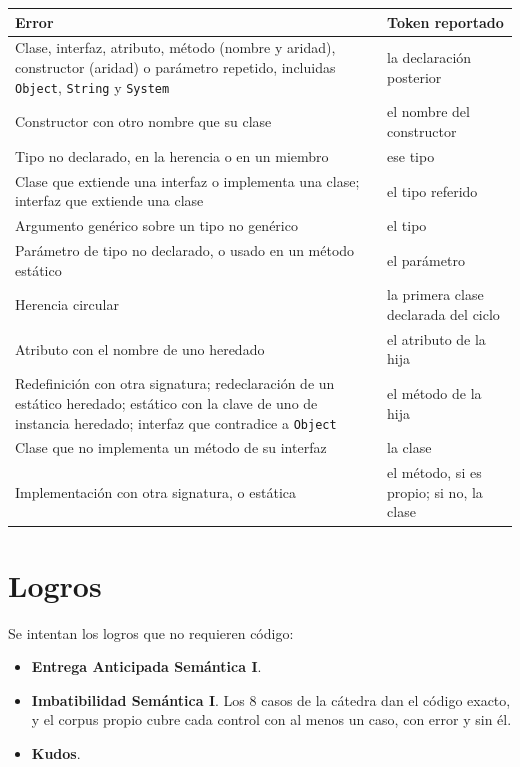 \documentclass[12pt,a4paper]{article}
\begin{document}
\begin{center}
\begin{tabular}{>{\raggedright\arraybackslash}p{9.6cm} >{\raggedright\arraybackslash}p{5.4cm}}
\toprule
\textbf{Error} & \textbf{Token reportado} \\
\midrule
Clase, interfaz, atributo, método (nombre y aridad), constructor (aridad) o parámetro repetido,
incluidas \texttt{Object}, \texttt{String} y \texttt{System} & la declaración posterior \\
Constructor con otro nombre que su clase & el nombre del constructor \\
Tipo no declarado, en la herencia o en un miembro & ese tipo \\
Clase que extiende una interfaz o implementa una clase; interfaz que extiende una clase & el tipo
referido \\
Argumento genérico sobre un tipo no genérico & el tipo \\
Parámetro de tipo no declarado, o usado en un método estático & el parámetro \\
Herencia circular & la primera clase declarada del ciclo \\
Atributo con el nombre de uno heredado & el atributo de la hija \\
Redefinición con otra signatura; redeclaración de un estático heredado; estático con la clave de
uno de instancia heredado; interfaz que contradice a \texttt{Object} & el método de la hija \\
Clase que no implementa un método de su interfaz & la clase \\
Implementación con otra signatura, o estática & el método, si es propio; si no, la clase \\
\bottomrule
\end{tabular}
\end{center}

\section{Logros}

Se intentan los logros que no requieren código:

\begin{itemize}
  \item \textbf{Entrega Anticipada Semántica I}.
  \item \textbf{Imbatibilidad Semántica I}. Los 8 casos de la cátedra dan el código exacto, y el
        corpus propio cubre cada control con al menos un caso, con error y sin él.
  \item \textbf{Kudos}.
\end{itemize}
\end{document}
